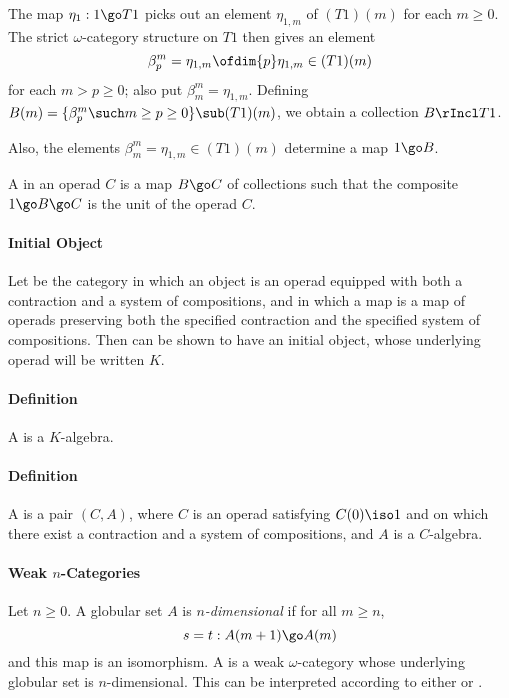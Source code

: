 The map $\eta_1: 1 \go T1$ picks out an element $\eta_{1,m}$ of $(T1)(m)$
for each $m\geq 0$.  The strict $\omega$-category structure on $T1$ then
gives an element
\[
\beta_p^m = \eta_{1,m} \ofdim{p} \eta_{1,m} \in (T1)(m)
\]
for each $m > p \geq 0$; also put $\beta_m^m = \eta_{1,m}$.  Defining
$B(m) = \{ \beta_p^m \such m \geq p \geq 0 \} \sub (T1)(m)$, we obtain a
collection $B \rIncl T1$.

Also, the elements $\beta_m^m = \eta_{1,m} \in (T1)(m)$ determine a map $1
\go B$.

A  in an operad $C$ is a map $B \go C$ of
collections such that the composite $1 \go B \go C$ is the unit of the
operad $C$.

\paragraph{Initial Object}  

Let  be the category in which an object is an operad equipped with
both a contraction and a system of compositions, and in which a map is a map
of operads preserving both the specified contraction and the specified system
of compositions.  Then  can be shown to have an initial object,
whose underlying operad will be written $K$.



\paragraph{Definition } 

A  is a $K$-algebra.

\paragraph{Definition } 

A  is a pair $(C,A)$, where $C$ is an operad
satisfying $C(0) \iso 1$ and on which there exist a contraction and a system
of compositions, and $A$ is a $C$-algebra.

\paragraph{Weak $n$-Categories}

Let $n\geq 0$.  A globular set $A$ is \emph{$n$-dimensional} if for all
$m\geq n$,
\[
s=t: A(m+1) \go A(m)
\]
and this map is an isomorphism.  A  is a weak
$\omega$-category whose underlying globular set is $n$-dimensional.  This can
be interpreted according to either  or .


